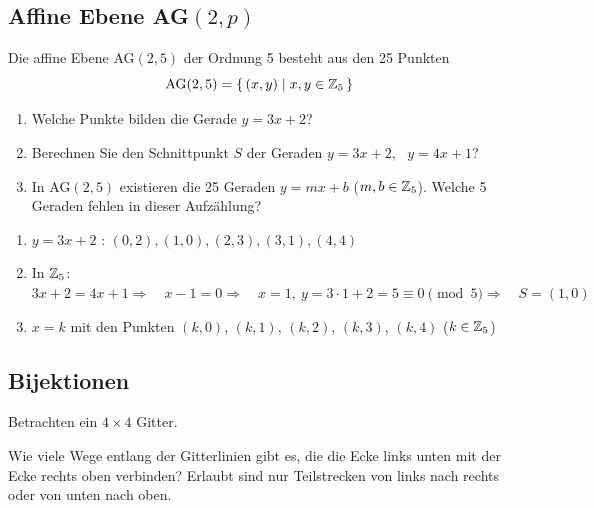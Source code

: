 \subsection{Affine Ebene AG$(2, p)$}

\begin{aufgabe}[Aufgabe 3]
Die affine Ebene AG$(2,5)$ der Ordnung 5 besteht aus den 25 Punkten
\[
\mathrm{AG}(2,5) = \{\, (x, y) \mid x, y \in \mathbb{Z}_{5} \,\}
\]
\begin{enumerate}[label=\alph*)]
\item Welche Punkte bilden die Gerade $y = 3x + 2$?
\item Berechnen Sie den Schnittpunkt $S$ der Geraden $y = 3x + 2$, \ $y = 4x + 1$?
\item In AG$(2,5)$ existieren die 25 Geraden $y = mx + b$ \quad ($m, b \in \mathbb{Z}_{5}$).
Welche 5 Geraden fehlen in dieser Aufzählung?
\end{enumerate}
\end{aufgabe}

\begin{loesung}
\begin{enumerate}[label=\alph*)]
\item $y = 3x + 2$ : $(0, 2), (1, 0), (2, 3), (3, 1), (4, 4)$
\item In $\mathbb{Z}_{5}$: $3x + 2 = 4x + 1 \Rightarrow \quad x - 1 = 0 \Rightarrow \quad x = 1,\ y = 3 \cdot 1 + 2 = 5 \equiv 0 \pmod 5 \Rightarrow \quad S = (1, 0)$
\item $x = k$ mit den Punkten $(k, 0)$, $(k, 1)$, $(k, 2)$, $(k, 3)$, $(k, 4)$ \quad ($k \in \mathbb{Z}_{5}$)
\end{enumerate}
\end{loesung}

\subsection{Bijektionen}

\begin{aufgabe}[Aufgabe 4]
Betrachten ein $4 \times 4$ Gitter.

Wie viele Wege entlang der Gitterlinien gibt es, die die Ecke links unten mit der Ecke rechts oben verbinden? Erlaubt sind nur Teilstrecken von links nach rechts oder von unten nach oben.
\end{aufgabe}

